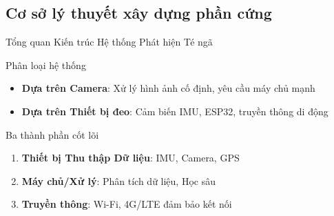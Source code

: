 
\subsection{Cơ sở lý thuyết xây dựng phần cứng}

\begin{frame}{Tổng quan Kiến trúc Hệ thống Phát hiện Té ngã}
\begin{block}{Phân loại hệ thống}
\begin{itemize}
\item \textbf{Dựa trên Camera}: Xử lý hình ảnh cố định, yêu cầu máy chủ mạnh
\item \textbf{Dựa trên Thiết bị đeo}: Cảm biến IMU, ESP32, truyền thông di động
\end{itemize}
\end{block}

\begin{block}{Ba thành phần cốt lõi}
\begin{enumerate}
\item \textbf{Thiết bị Thu thập Dữ liệu}: IMU, Camera, GPS
\item \textbf{Máy chủ/Xử lý}: Phân tích dữ liệu, Học sâu
\item \textbf{Truyền thông}: Wi-Fi, 4G/LTE đảm bảo kết nối
\end{enumerate}
\end{block}
\end{frame}


